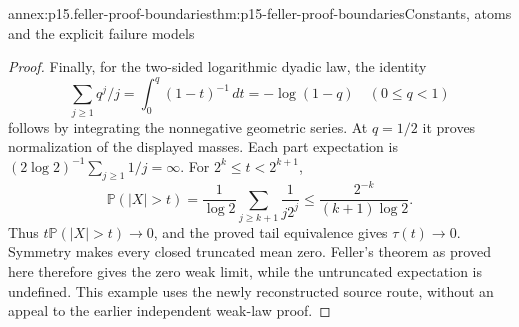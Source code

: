 \begin{annexitem}{annex:p15.feller-proof-boundaries}{thm:p15-feller-proof-boundaries}{Constants, atoms and the explicit failure models}
\begin{proof}
Finally, for the two-sided logarithmic dyadic law, the identity
\[
 \sum_{j\geq1}q^j/j
       =\int_0^q(1-t)^{-1}\,dt=-\log(1-q)
                         \quad(0\leq q<1)
\]
follows by integrating the nonnegative geometric series.
At \(q=1/2\) it proves normalization of the displayed masses.
Each part expectation is
\((2\log2)^{-1}\sum_{j\geq1}1/j=\infty\).
For \(2^k\leq t<2^{k+1}\),
\[
 \mathbb P(|X|>t)
  =\frac1{\log2}\sum_{j\geq k+1}\frac1{j2^j}
  \leq\frac{2^{-k}}{(k+1)\log2}.
\]
Thus \(t\mathbb P(|X|>t)\to0\), and the proved tail equivalence
gives \(\tau(t)\to0\). Symmetry makes every closed truncated
mean zero. Feller's theorem as proved here therefore gives the
zero weak limit, while the untruncated expectation is undefined.
This example uses the newly reconstructed source route, without
an appeal to the earlier independent weak-law proof.
\end{proof}
\end{annexitem}
